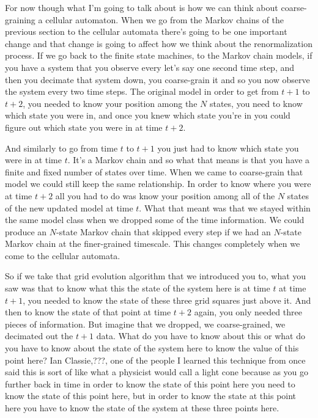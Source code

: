 \documentclass[]{article}
\begin{document}
For now though what I'm going to talk about is how we can think about coarse-graining a cellular automaton.
When we go from the Markov chains of the previous section to the cellular automata  there's going to be one important change and that change is going to affect how we think about the renormalization process. If we go back to the finite state machines, to the Markov chain models, if you have a system that you observe every let's say one second time step, and then you decimate that system down,
you coarse-grain it and so you now observe the system every two time steps. 
The original model in order to get from $t+1$ to $t+2$, you needed to know your position among the $N$ states, you need to know which state you were in, and once you knew which state you're in you could figure out which state you were in at time $t+2$.

And similarly to go from time $t$ to $t+1$ you just had to know which state you were in at time $t$. It's a Markov chain and so what that means is that you have a finite and fixed number of states over time. When we came to coarse-grain that model 
we could still keep the same relationship. In order to know where you were at time $t+2$ all you had to do was know your position among all of the $N$ states of the
new updated model at time $t$. What that meant was that we stayed within the same model class when we dropped some of the time information. We could produce an $N$-state Markov chain that skipped every step if we had an $N$-state Markov chain at the finer-grained timescale. This changes completely when we come to the cellular automata.

So if we take that grid evolution algorithm that we introduced you to, what you saw was that to know what this the state of the system here is at time $t$ at time $t+1$,
you needed to know the state of these three grid squares just above it. And then to know the state of that point at time $t+2$ again, you only needed three pieces of information.
But imagine that we dropped, we coarse-grained, we decimated out the $t+1$ data.
What do you have to know about this or what do you have to know about the state of the system here to know the value of this point here? Ian Classie,???, one of the people I learned this technique from once said this is sort of like what a physicist would call a light cone because as you go further back in time in order to know the state of this point here you need to know the state of this point here, but in order to know the state at this point here you have to know the state of the system at 
these three points here.
\end{document}
